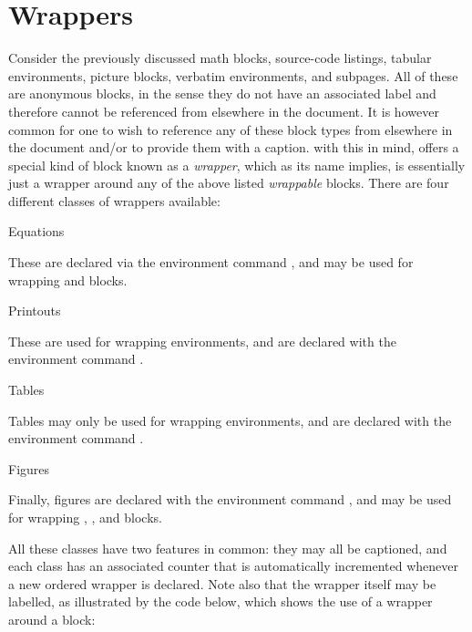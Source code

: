 \section[sec:wrappers]{Wrappers}

Consider the previously discussed math blocks, source-code listings, tabular
environments, picture blocks, verbatim environments, and subpages.  All of these are
anonymous blocks, in the sense they do not have an associated label and therefore
cannot be referenced from elsewhere in the document.   It is however common for one
to wish to reference any of these block types from elsewhere in the document and/or
to provide them with a caption.  with this in mind, \lambtex offers a special kind
of block known as a \emph{wrapper}, which as its name implies, is essentially just
a wrapper around any of the above listed \emph{wrappable} blocks.  There are four
different classes of wrappers available:

\begin{description}

\item{Equations}

    These are declared via the environment command ,
    and may be used for wrapping  and  blocks.

\item{Printouts}

    These are used for wrapping  environments, and are
    declared with the environment command .

\item{Tables}

    Tables may only be used for wrapping  environments,
    and are declared with the environment command .

\item{Figures}

    Finally, figures are declared with the environment command
    , and may be used for wrapping ,
    , and  blocks.

\end{description}

All these classes have two features in common: they may all be captioned, and each
class has an associated counter that is automatically incremented whenever a new
ordered wrapper is declared.  Note also that the wrapper itself may be labelled, as
illustrated by the code below, which shows the use of a  wrapper around
a  block:

